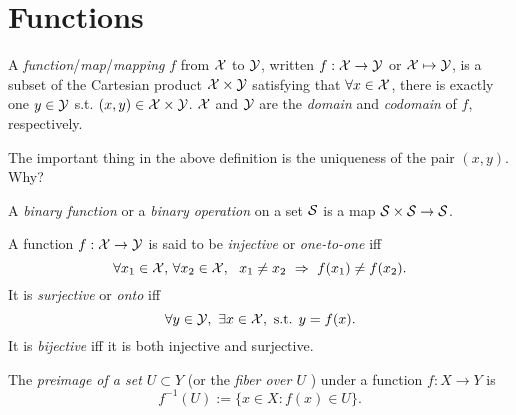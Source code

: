 \section{Functions}
\label{sec:functions}

\begin{defn}
  A \emph{function}/\emph{map}/\emph{mapping} $f$
  from ${\cal X}$ to ${\cal Y}$,
  written $f: {\cal X}\rightarrow {\cal Y}$ or ${\cal X}\mapsto {\cal Y}$,
  is a subset of the Cartesian product ${\cal X} \times {\cal Y}$
  satisfying that
  $\forall x\in {\cal X}$,
  there is exactly one $y\in {\cal Y}$
  s.t. $(x,y)\in {\cal X}\times {\cal Y}$.
  ${\cal X}$ and ${\cal Y}$ are
  the \emph{domain} and \emph{codomain} of $f$,
  respectively.
\end{defn}

\begin{rem}
The important thing in the above definition
 is the uniqueness of the pair $(x,y)$.
Why?
\end{rem}

\begin{defn}
  A \emph{binary function} or a \emph{binary operation} on a set ${\cal S}$
  is a map \mbox{${\cal S}\times{\cal S} \rightarrow {\cal S}$}.
\end{defn}

\begin{defn}
  A function $f:{\cal X}\rightarrow {\cal Y}$ is said to be
  \emph{injective} or \emph{one-to-one} iff
   \begin{equation}
     \forall x_1\in {\cal X},\, \forall x_2\in {\cal X},\ \ 
     x_1\ne x_2 \ \Rightarrow\ f(x_1)\ne f(x_2).
   \end{equation}
  It is \emph{surjective} or \emph{onto} iff
   \begin{equation}
     \forall y\in {\cal Y},\ \exists x\in {\cal X}, \text{ s.t. }
     y=f(x).
   \end{equation}
  It is \emph{bijective} iff it is both injective and surjective.
\end{defn}

\begin{defn}
  \label{def:preimage}
  The \emph{preimage of a set $U\subset Y$}
  (or the \emph{fiber over $U$ })
  under a function $f: X\rightarrow Y$ is 
   \begin{equation}
     \label{eq:preimage}
     f^{-1}(U) := \{ x\in X: f(x)\in U\}.
   \end{equation}
\end{defn}

